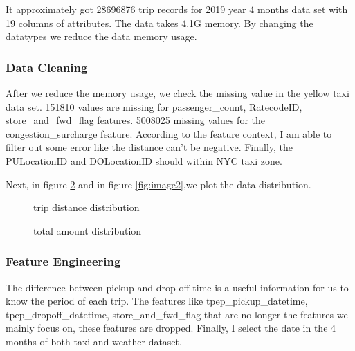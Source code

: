 \documentclass[11pt]{article}
\begin{document}
It approximately got 28696876 trip records for 2019 year 4 months data set with 19 columns of attributes. The data takes 4.1G memory. By changing the datatypes we reduce the data memory usage.

\subsubsection{Data Cleaning}

After we reduce the memory usage, we check the missing value in the yellow taxi data set.
151810 values are missing for passenger\_count, RatecodeID, store\_and\_fwd\_flag features. 5008025 missing values for the congestion\_surcharge feature. According to the feature context, I am able to filter out some error like the distance can't be negative. Finally, the PULocationID and DOLocationID should within NYC taxi zone.\cite{TaxiZone}


Next, in ﬁgure \ref{fig:image1} and in ﬁgure \ref{fig:image2},we plot the data distribution.

\begin{figure}[!h]
    \centering
    \caption{trip distance distribution} %
    \label{fig:image1}
\end{figure}

\begin{figure}[!h]
    \centering
    \caption{total amount distribution} %
    \label{fig:image1}
\end{figure}

\subsubsection{Feature Engineering}

The diﬀerence between pickup and drop-oﬀ time is a useful information for us to know the  period of each trip. The features like tpep\_pickup\_datetime, tpep\_dropoff\_datetime, store\_and\_fwd\_flag that are no longer the features we mainly focus on, these features are dropped. Finally, I select the date in the 4 months of both taxi and weather dataset.
\end{document}
